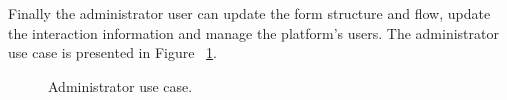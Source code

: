 Finally the administrator user can update the form structure and flow, update the interaction information and manage the platform's users.
The administrator use case is presented in Figure ~\ref{fig:administrator_use_case}.
\begin{figure}[h]
	\begin{center}
	\end{center}
	\caption{Administrator use case.}\label{fig:administrator_use_case}
\end{figure}